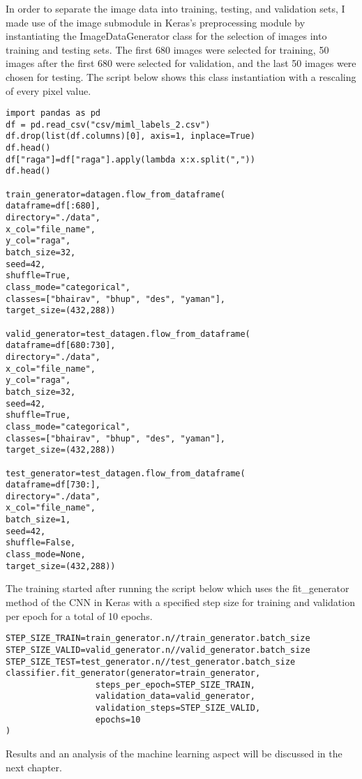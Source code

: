 In order to separate the image data into training, testing, and validation sets, I made use of the image submodule in Keras's preprocessing module by instantiating the ImageDataGenerator class for the selection of images into training and testing sets. The first 680 images were selected for training, 50 images after the first 680 were selected for validation, and the last 50 images were chosen for testing. The script below shows this class instantiation with a rescaling of every pixel value.

\begin{lstlisting}
import pandas as pd
df = pd.read_csv("csv/miml_labels_2.csv")
df.drop(list(df.columns)[0], axis=1, inplace=True)
df.head()
df["raga"]=df["raga"].apply(lambda x:x.split(","))
df.head()

train_generator=datagen.flow_from_dataframe(
dataframe=df[:680],
directory="./data",
x_col="file_name",
y_col="raga",
batch_size=32,
seed=42,
shuffle=True,
class_mode="categorical",
classes=["bhairav", "bhup", "des", "yaman"],
target_size=(432,288))

valid_generator=test_datagen.flow_from_dataframe(
dataframe=df[680:730],
directory="./data",
x_col="file_name",
y_col="raga",
batch_size=32,
seed=42,
shuffle=True,
class_mode="categorical",
classes=["bhairav", "bhup", "des", "yaman"],
target_size=(432,288))

test_generator=test_datagen.flow_from_dataframe(
dataframe=df[730:],
directory="./data",
x_col="file_name",
batch_size=1,
seed=42,
shuffle=False,
class_mode=None,
target_size=(432,288))
\end{lstlisting}

The training started after running the script below which uses the fit\_generator method of the CNN in Keras with a specified step size for training and validation per epoch for a total of 10 epochs.

\begin{lstlisting}
STEP_SIZE_TRAIN=train_generator.n//train_generator.batch_size
STEP_SIZE_VALID=valid_generator.n//valid_generator.batch_size
STEP_SIZE_TEST=test_generator.n//test_generator.batch_size
classifier.fit_generator(generator=train_generator,
                  steps_per_epoch=STEP_SIZE_TRAIN,
                  validation_data=valid_generator,
                  validation_steps=STEP_SIZE_VALID,
                  epochs=10
)
\end{lstlisting}

Results and an analysis of the machine learning aspect will be discussed in the next chapter.

